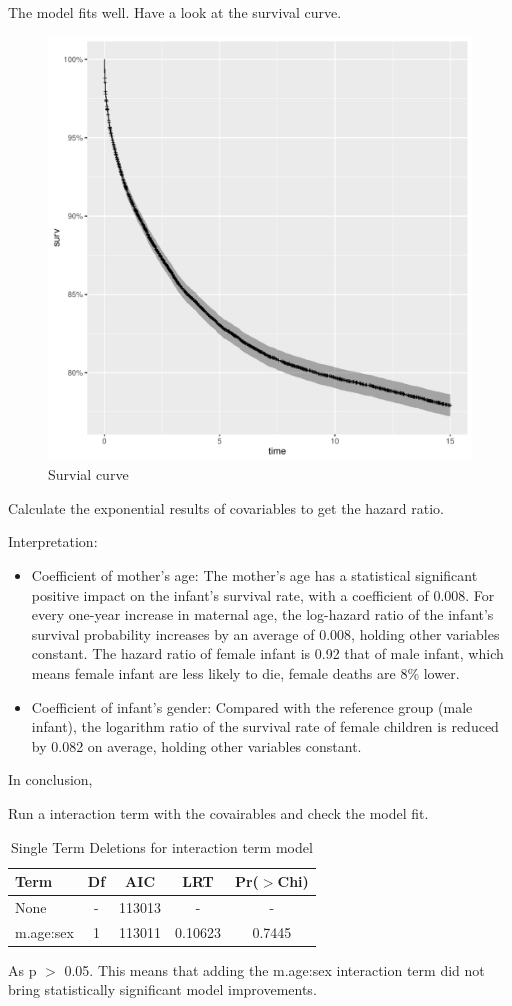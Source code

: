 \documentclass[12pt,letterpaper]{article}
\begin{document}
\noindent The model fits well. Have a look at the survival curve.


\begin{figure}[htbp]
	\centering
	\includegraphics[width=0.6\linewidth]{Survial curve.pdf} 
	\caption{Survial curve} 
	\label{fig:Survial curve} 
\end{figure}


\noindent Calculate the exponential results of covariables to get the hazard ratio.


\noindent Interpretation:
\begin{itemize}
	\item Coefficient of mother's age: The mother's age has a statistical significant positive impact on the infant's survival rate, with a coefficient of 0.008. For every one-year increase in maternal age, the log-hazard ratio of the infant's survival probability increases by an average of 0.008, holding other variables constant. The hazard ratio of female infant is 0.92 that of male infant, which means female infant are less likely to die, female deaths are 8\% lower.
	
	\item Coefficient of infant's gender: Compared with the reference group (male infant), the logarithm ratio of the survival rate of female children is reduced by 0.082 on average, holding other variables constant.
\end{itemize}
\noindent In conclusion, 

\noindent Run a interaction term with the covairables and check the model fit.


	\begin{table}[h]
	\centering
		\caption{Single Term Deletions for interaction term model}
	\begin{tabular}{lcccc}
		\hline
		Term & Df & AIC & LRT & Pr($>$Chi) \\
		\hline
		None & - & 113013 & - & - \\
		m.age:sex & 1 & 113011 & 0.10623 & 0.7445 \\
		\hline
	\end{tabular}
	\label{table:single_term_deletions}
\end{table}

\noindent As p $>$ 0.05. This means that adding the m.age:sex interaction term did not bring statistically significant model improvements.
\end{document}
